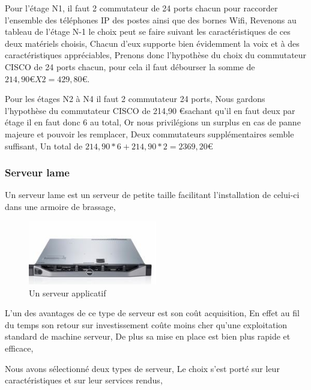 Pour l'étage N1, il faut 2 commutateur de 24 ports chacun pour raccorder l'ensemble des téléphones IP des postes ainsi que des bornes Wifi,
Revenons au tableau de l'étage N-1 le choix peut se faire suivant les caractéristiques de ces deux matériels choisis,
Chacun d'eux supporte bien évidemment la voix et à des caractéristiques appréciables,
Prenons donc l'hypothèse du choix du commutateur CISCO de 24 ports chacun, pour cela il faut débourser la somme de $214,90  \euro    X 2 = 429,80   \euro$.

Pour les étages N2 à N4 il faut 2 commutateur 24 ports,
Nous gardons l'hypothèse du commutateur CISCO de 214,90   \euro    sachant qu'il en faut deux par étage il en faut donc 6 au total,
Or nous privilégions un surplus en cas de panne majeure et pouvoir les remplacer,
Deux commutateurs supplémentaires semble suffisant,
Un total de $214,90 * 6 + 214,90 * 2 = 2369,20   \euro    $



\subsubsection{Serveur lame }

Un serveur lame est un serveur de petite taille facilitant l'installation de celui-ci dans une armoire de brassage,

\begin{figure}[!ht]
    \center
    \includegraphics[width=0.5\textwidth]{./images/13.png}
    \caption{Un serveur applicatif}
\end{figure}

L'un des  avantages de ce type de serveur est son coût acquisition,
En effet au fil du temps son retour sur investissement coûte moins cher qu'une exploitation standard de machine serveur,
De plus sa mise en place est bien plus rapide et efficace,

Nous avons sélectionné deux types de serveur, Le choix s'est porté sur leur caractéristiques et sur leur services rendus,

